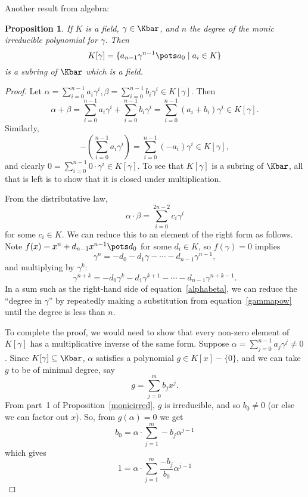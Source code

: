 \documentclass[12pt]{amsart}
\theoremstyle{plain}
\newtheorem{prop}[thm]{Proposition}
\theoremstyle{definition}
\theoremstyle{remark}
\begin{document}
Another result from algebra:
\begin{prop} \label{ext-field}
  If $K$ is a field, $\gamma\in \Kbar$, and $n$ the degree of the monic
  irreducible polynomial for $\gamma$.  Then
  \[ K[\gamma]= \{a_{n-1}\gamma^{n-1}\pots a_0 \mid a_i\in K\}\]
  is a subring of $\Kbar$ which is a field.
\end{prop}
\begin{proof}
  Let $\alpha=\sum_{i=0}^{n-1} a_i \gamma^i, \beta=\sum_{i=0}^{n-1} b_i \gamma^i\in
  K[\gamma]$.  Then
  \[ \alpha+\beta=\sum_{i=0}^{n-1} a_i \gamma^i+\sum_{i=0}^{n-1} b_i
  \gamma^i =\sum_{i=0}^{n-1} (a_i+b_i) \gamma^i \in K[\gamma].\]
Similarly,
\[ -\left(\sum_{i=0}^{n-1} a_i \gamma^i\right)=\sum_{i=0}^{n-1} (-a_i)
\gamma^i\in K[\gamma],\]
and clearly $0=\sum_{i=0}^{n-1} 0\cdot \gamma^i\in K[\gamma]$.  To see
that $K[\gamma]$ is a subring of $\Kbar$, all that is left is to show
that it is closed under multiplication.

From the distributative law,
\begin{equation} \label{alphabeta}
 \alpha\cdot\beta = \sum_{i=0}^{2n-2} c_i \gamma^i
\end{equation}
for some $c_i\in K$.  We can reduce this to an element of the right
form as follows.  Note $f(x)=x^n+d_{n-1}x^{n-1}\pots d_0$ for some
$d_i\in K$, so $f(\gamma)=0$ implies
\[ \gamma^n = -d_0-d_1\gamma-\cdots -d_{n-1}\gamma^{n-1},\]
and multiplying by $\gamma^k$:
\begin{equation}\label{gammapow}
 \gamma^{n+k} = -d_0\gamma^k-d_1\gamma^{k+1}-\cdots
-d_{n-1}\gamma^{n+k-1}.
\end{equation}
In a sum such as the right-hand side of equation~\eqref{alphabeta}, we
can reduce the ``degree in $\gamma$'' by repeatedly making a
substitution from equation~\eqref{gammapow} until the degree is less
than $n$.

To complete the proof, we would need to show that every non-zero
element of $K[\gamma]$ has a multiplicative inverse of the same
form.
Suppose $\alpha=\sum_{j=0}^{n-1} a_j \gamma^j\neq 0$. Since 
$K[\gamma]\subseteq \Kbar$, $\alpha$ satisfies a polynomial 
$g\in K[x]-\{0\}$,
and we can take $g$ to be of minimal degree, say
\[ g = \sum_{j=0}^m b_j x^j.\]
From part~1 of Proposition~\ref{monicirred}, $g$ is irreducible, and
so $b_0\neq 0$ (or else we can factor out $x$).  So, from $g(\alpha)=0$
we get
\[ b_0 = \alpha\cdot \sum_{j=1}^m -b_j \alpha^{j-1}\]
which gives
\[ 1 = \alpha\cdot \sum_{j=1}^m \frac{-b_j}{b_0} \alpha^{j-1}\]
\end{proof}
\end{document}
